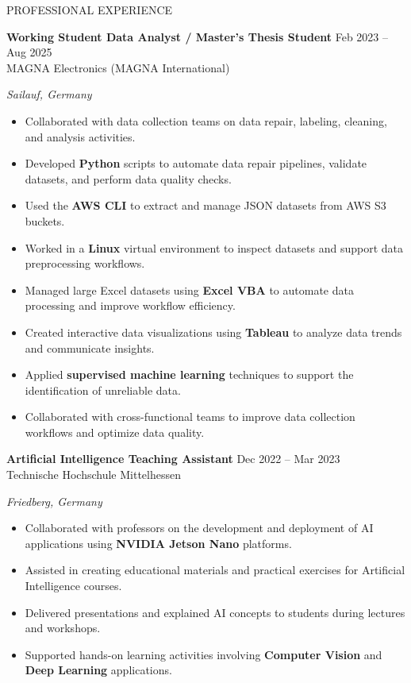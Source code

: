 \documentclass{resume} %
\begin{document}
\begin{rSection}{PROFESSIONAL EXPERIENCE}
\vspace{1em}

\textbf{Working Student Data Analyst / Master's Thesis Student} \hfill Feb 2023 -- Aug 2025\\
MAGNA Electronics (MAGNA International) \hfill
\parbox[t]{10cm}{\raggedleft\itshape Sailauf, Germany}

\begin{itemize}
  \itemsep -3pt
  \item Collaborated with data collection teams on data repair, labeling, cleaning, and analysis activities.
  \item Developed \textbf{Python} scripts to automate data repair pipelines, validate datasets, and perform data quality checks.
  \item Used the \textbf{AWS CLI} to extract and manage JSON datasets from AWS S3 buckets.
  \item Worked in a \textbf{Linux} virtual environment to inspect datasets and support data preprocessing workflows.
  \item Managed large Excel datasets using \textbf{Excel VBA} to automate data processing and improve workflow efficiency.
  \item Created interactive data visualizations using \textbf{Tableau} to analyze data trends and communicate insights.
  \item Applied \textbf{supervised machine learning} techniques to support the identification of unreliable data.
  \item Collaborated with cross-functional teams to improve data collection workflows and optimize data quality.
\end{itemize}

\textbf{Artificial Intelligence Teaching Assistant} \hfill Dec 2022 -- Mar 2023\\
Technische Hochschule Mittelhessen \hfill
\parbox[t]{10cm}{\raggedleft\itshape Friedberg, Germany}

\begin{itemize}
  \itemsep -3pt
  \item Collaborated with professors on the development and deployment of AI applications using \textbf{NVIDIA Jetson Nano} platforms.
  \item Assisted in creating educational materials and practical exercises for Artificial Intelligence courses.
  \item Delivered presentations and explained AI concepts to students during lectures and workshops.
  \item Supported hands-on learning activities involving \textbf{Computer Vision} and \textbf{Deep Learning} applications.
\end{itemize}


\end{rSection}
\end{document}
